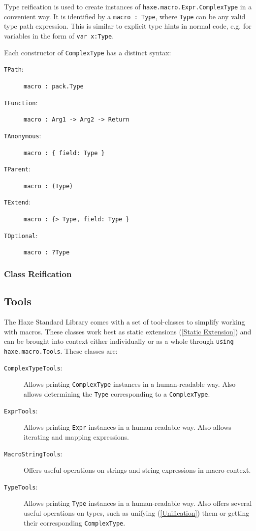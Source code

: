 \documentclass{article}
\newcommand{\type}[1]{\texttt{#1}}
\newcommand{\expr}[1]{\texttt{#1}}
\newcommand{\tref}[2]{#1 (\ref{#2})}
\begin{document}
Type reification is used to create instances of \type{haxe.macro.Expr.ComplexType} in a convenient way. It is identified by a \expr{macro : Type}, where \expr{Type} can be any valid type path expression. This is similar to explicit type hints in normal code, e.g. for variables in the form of \expr{var x:Type}.

Each constructor of \type{ComplexType} has a distinct syntax:

\begin{description}
	\item[\expr{TPath}:] \expr{macro : pack.Type}
	\item[\expr{TFunction}:] \expr{macro : Arg1 -> Arg2 -> Return}
	\item[\expr{TAnonymous}:] \expr{macro : \{ field: Type \}}
	\item[\expr{TParent}:] \expr{macro : (Type)}
	\item[\expr{TExtend}:] \expr{macro : \{> Type, field: Type \}}
	\item[\expr{TOptional}:] \expr{macro : ?Type}
\end{description}

\subsubsection{Class Reification}


\subsection{Tools}
\label{Macro Tools}

The Haxe Standard Library comes with a set of tool-classes to simplify working with macros. These classes work best as \tref{static extensions}{Static Extension} and can be brought into context either individually or as a whole through \expr{using haxe.macro.Tools}. These classes are:

\begin{description}
	\item[\type{ComplexTypeTools}:] Allows printing \type{ComplexType} instances in a human-readable way. Also allows determining the \type{Type} corresponding to a \type{ComplexType}.
	\item[\type{ExprTools}:] Allows printing \type{Expr} instances in a human-readable way. Also allows iterating and mapping expressions.
	\item[\type{MacroStringTools}:] Offers useful operations on strings and string expressions in macro context.
	\item[\type{TypeTools}:] Allows printing \type{Type} instances in a human-readable way. Also offers several useful operations on types, such as \tref{unifying}{Unification} them or getting their corresponding \type{ComplexType}.
\end{description}
\end{document}
